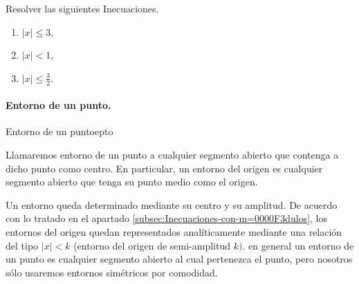 \documentclass[oneside,english,spanish,2m,twoside,svgnames,x11names,HTML,twoside,12pt]{libro-matua}\usepackage[]{graphicx}\usepackage[]{color}
\newcommand{\val}[1]{\left|#1\right|}
\begin{document}
\begin{ejercicios}[]

Resolver las siguientes Inecuaciones.
\begin{enumerate}
\item $\val{x}\leq3,$
\item $\val{x}<1,$
\item $\val{x}\leq\frac{3}{2}.$
\end{enumerate}
\end{ejercicios}

\paragraph{Entorno de un punto.}

\begin{defi}{Entorno de un punto}{epto}

Llamaremos entorno de un punto a cualquier segmento abierto que contenga
a dicho punto como centro. En particular, un entorno del origen es
cualquier segmento abierto que tenga su punto medio como el origen. 

\end{defi}

Un entorno queda determinado mediante su centro y su amplitud. De
acuerdo con lo tratado en el apartado \ref{subsec:Inecuaciones-con-m=0000F3dulos},
los entornos del origen quedan representados analíticamente mediante
una relación del tipo $\val{x}<k$ (entorno del origen de semi-amplitud
$k)$. en general un entorno de un punto es cualquier segmento abierto
al cual pertenezca el punto, pero nosotros sólo usaremos entornos
simétricos por comodidad.
\end{document}
